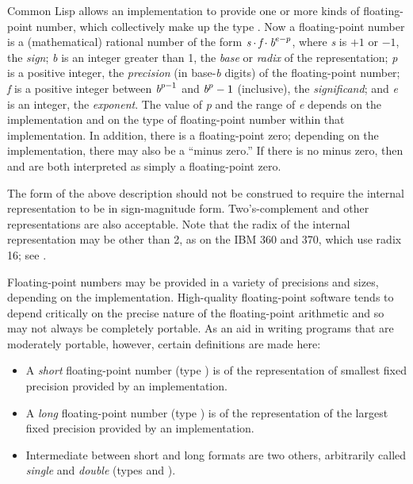 Common Lisp allows an implementation to provide one or more kinds of
floating-point number, which collectively make up the type .
Now a floating-point number is a (mathematical)
rational number of the form
$\emph{s} \cdot \emph{f} \cdot \emph{b}^{e-p}$,
where \emph{s} is $+1$ or $-1$, the \emph{sign};
\emph{b} is an integer greater than 1,
the \emph{base} or \emph{radix} of the representation;
\emph{p} is a positive integer,
the \emph{precision} (in base-\emph{b} digits) of the floating-point number;
\emph{f} is a positive integer between
$\emph{b}^{p-1}$ and $\emph{b}^{p}-1$ (inclusive),
the \emph{significand};
and \emph{e} is an integer, the \emph{exponent}.
The value of \emph{p} and the range of \emph{e}
depends on the implementation and on the type of floating-point number
within that implementation.
In addition, there is a floating-point zero;
depending on the implementation, there may also be a ``minus zero.''
If there is no minus zero, then  and  are
both interpreted as simply a floating-point zero.

\beforenoterule
\begin{implementation}
The form of the above description should not be construed
to require the internal representation to be in sign-magnitude form.
Two's-complement and other representations are also acceptable.  Note
that the radix of the internal representation may be other than 2, as on
the IBM 360 and 370, which use radix 16; see
.
\end{implementation}
\afternoterule

Floating-point numbers may be provided in a variety of precisions and sizes,
depending on the implementation.  High-quality floating-point
software tends to depend critically on the precise nature of the
floating-point arithmetic and so may not always be completely portable.
As an aid in writing programs that are
moderately portable, however, certain definitions are made here:
\begin{itemize}
\item
A \emph{short} floating-point number (type )
is of the representation of smallest
fixed precision provided by an implementation.

\item
A \emph{long} floating-point number (type )
is of the representation of the largest fixed 
precision provided by an implementation.

\item
Intermediate between short and long formats are two others, arbitrarily
called \emph{single} and \emph{double} (types  and ).
\end{itemize}


